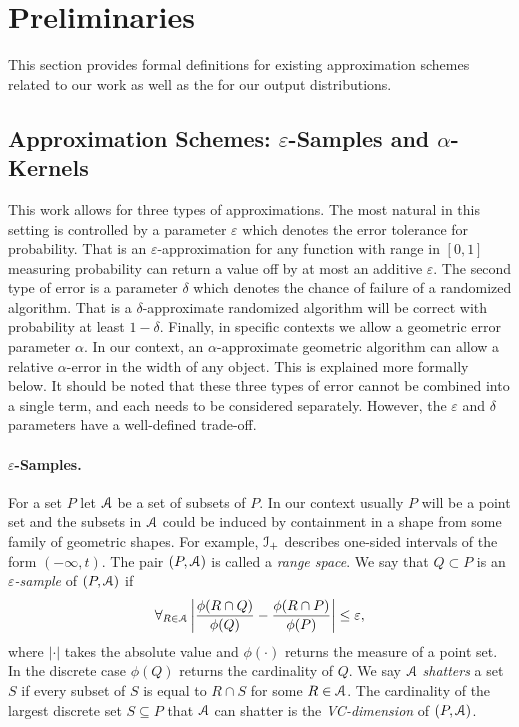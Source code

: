 \documentclass{journal}
\newcommand{\eps}{\varepsilon}
\newcommand{\Eu}[1]{\ensuremath{\EuScript{#1}}}
\begin{document}
\section {Preliminaries}\label{sec:prelim}

This section provides formal definitions for existing approximation schemes related to our work as well as the for our output distributions.  

\subsection{Approximation Schemes: $\eps$-Samples and $\alpha$-Kernels}

This work allows for three types of approximations.  The most natural in this setting is controlled by a parameter $\eps$ which denotes the error tolerance for probability.  That is an $\eps$-approximation for any function with range in $[0,1]$ measuring probability can return a value off by at most an additive $\eps$.  
The second type of error is a parameter $\delta$ which denotes the chance of failure of a randomized algorithm.  That is a $\delta$-approximate randomized algorithm will be correct with probability at least $1-\delta$.  
Finally, in specific contexts we allow a geometric error parameter $\alpha$.  In our context, an $\alpha$-approximate geometric algorithm can allow a relative $\alpha$-error in the width of any object.  This is explained more formally below.  
It should be noted that these three types of error cannot be combined into a single term, and each needs to be considered separately.  However, the $\eps$ and $\delta$ parameters have a well-defined trade-off.  

\paragraph{$\eps$-Samples.}
For a set $P$ let $\Eu{A}$ be a set of subsets of $P$.  In our context usually $P$ will be a point set and the subsets in $\Eu{A}$ could be induced by containment in a shape from some family of geometric shapes.
For example, $\Eu{I}_+$ describes one-sided intervals of the form $(-\infty, t)$.
The pair $(P, \Eu{A})$ is called a \emph{range space}.  We say that $Q \subset P$ is an \emph{$\eps$-sample} of $(P,\Eu{A})$ if
\[
\forall_{R \in \Eu{A}} \left|\frac{\phi(R \cap Q)}{\phi(Q)} - \frac{\phi(R \cap P)}{\phi(P)}\right| \leq \eps,
\]
where $|\cdot|$ takes the absolute value and $\phi(\cdot)$ returns the measure of a point set.  In the discrete case $\phi(Q)$ returns the cardinality of $Q$.  We say $\Eu{A}$ \emph{shatters} a set $S$ if every subset of $S$ is equal to $R \cap S$ for some $R \in \Eu{A}$.  The cardinality of the largest discrete set $S \subseteq P$ that $\Eu{A}$ can shatter is the \emph{VC-dimension} of $(P,\Eu{A})$.
\end{document}
